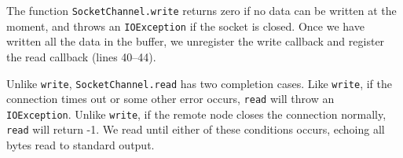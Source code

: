\documentclass[11pt]{article}
\begin{document}
The function \texttt{SocketChannel.write} returns zero if no data can be
written at the moment, and throws an \texttt{IOException} if the socket is
closed.  Once we have written all the data in the buffer, we unregister the
write callback and register the read callback (lines 40--44).

Unlike \texttt{write}, \texttt{SocketChannel.read} has two completion cases.
Like \texttt{write}, if the connection times out or some other error occurs,
\texttt{read} will throw an \texttt{IOException}.  Unlike \texttt{write},
if the remote node closes the connection normally, \texttt{read} will return
-1.  We read until either of these conditions occurs, echoing all bytes read
to standard output.

\begin{quote}
\lstset{language=Java, basicstyle=\small, numbers=left, numberstyle=\tiny, 
        numberfirstline=true, stepnumber=1, numbersep=5pt}

\end{quote}

\end{document}

